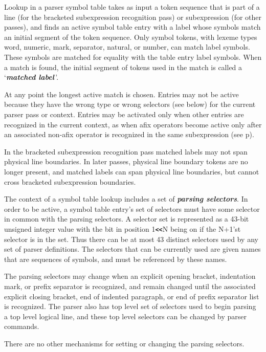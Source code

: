 \documentclass[12pt]{article}
\newcommand{\TT}[1]{{\tt \bfseries #1}}
\newcommand{\key}[1]{{\bf \em #1}\index{#1}}
\newcommand{\skey}[2]{{\bf \em #1#2}\index{#1}}
\newcommand{\pagref}[1]{p\pageref{#1}}
\begin{document}
Lookup in a parser symbol table takes as input a token sequence
that is part of a line (for the bracketed subexpression recognition pass)
or subexpression (for other passes), and finds an active symbol table
entry with a label whose symbols match an initial segment of the
token sequence.  Only symbol tokens, with lexeme types word, numeric,
mark, separator, natural, or number, can match label symbols.
These symbols
are matched for equality with the table entry label symbols.
When a match is found,
the initial segment of tokens used in the match is called
a `\key{matched label}\,'.

At any point the longest active match is chosen.  Entries may
not be active because they have the wrong type or wrong selectors (see below)
for the current parser pass or context.
Entries may be activated only when other entries are recognized
in the current context, as when afix operators become active
only after an associated non-afix operator is recognized in
the same subexpression (see \pagref{AFIX-FLAG}).

In the bracketed
subexpression recognition pass matched labels may not span physical
line boundaries.
In later passes, physical line boundary tokens are no longer present, and
matched labels can span physical line boundaries,
but cannot cross bracketed subexpression
boundaries.

The context of a symbol table lookup includes a set of
\skey{parsing selector}s.\label{PARSING-SELECTORS}
In order to be active, a symbol table entry's set of selectors
must have some selector in common with the parsing selectors.
A selector set is represented as a 43-bit unsigned integer value
with the bit in
position 1\TT{<{}<}N being on if the N+1'st selector is in the set.
Thus there can be at most 43 distinct selectors used by any set of
parser definitions.  The selectors that can be
currently used are given names that are sequences of symbols,
and must be referenced by these names.

The parsing selectors may change when an explicit opening bracket,
indentation mark, or prefix separator
is recognized, and remain changed until the associated explicit closing
bracket, end of indented paragraph, or end of prefix separator list
is recognized.  The parser also has top level set of selectors
used to begin parsing a top level logical line, and these top level
selectors can be changed by parser commands.

There are no other mechanisms for setting or changing the
parsing selectors.
\end{document}
